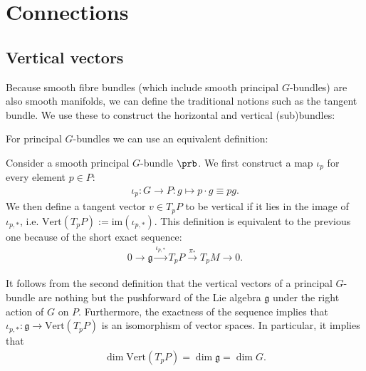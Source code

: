 \section{Connections}
\subsection{Vertical vectors}

    Because smooth fibre bundles (which include smooth principal $G$-bundles) are also smooth manifolds, we can define the traditional notions such as the tangent bundle. We use these to construct the horizontal and vertical (sub)bundles:

    For principal $G$-bundles we can use an equivalent definition:
    \begin{adefinition}
        Consider a smooth principal $G$-bundle $\prb$. We first construct a map $\iota_p$ for every element $p\in P$:
        \begin{gather}
            \iota_p:G\rightarrow P: g\mapsto p\cdot g\equiv pg.
        \end{gather}
        We then define a tangent vector $v\in T_p P$ to be vertical if it lies in the image of $\iota_{p,\ast}$, i.e. $\text{Vert}(T_pP) := \text{im}(\iota_{p,\ast})$. This definition is equivalent to the previous one because of the short exact sequence:
        \begin{gather}
            0\rightarrow\mathfrak{g}\xrightarrow{\iota_{p,\ast}}T_pP\xrightarrow{\pi_\ast}T_pM\rightarrow0.
        \end{gather}
    \end{adefinition}

    \begin{property}\label{diff:vertical_dimension}
        It follows from the second definition that the vertical vectors of a principal $G$-bundle are nothing but the pushforward of the Lie algebra $\mathfrak{g}$ under the right action of $G$ on $P$. Furthermore, the exactness of the sequence implies that $\iota_{p,\ast}:\mathfrak{g}\rightarrow\text{Vert}(T_pP)$ is an isomorphism of vector spaces. In particular, it implies that
        \begin{gather}
            \dim\text{Vert}(T_pP) = \dim\mathfrak{g} = \dim G.
        \end{gather}
    \end{property}

